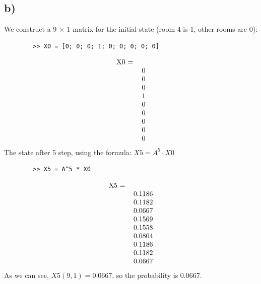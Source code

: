 \documentclass[12pt,en,a4paper]{article}
\begin{document}
	\subsection*{b)}
	We construct a 9 $\times$ 1 matrix for the initial state (room 4 is 1, other rooms are 0):
	\begin{mdframed}[hidealllines=true,backgroundcolor=magenta!10]
		\begin{lstlisting}
		>> X0 = [0; 0; 0; 1; 0; 0; 0; 0; 0]
		\end{lstlisting}
	\end{mdframed}
	\[
	\begin{tabular}{l r}
	X0 = & \\
	& 0 \\
	& 0 \\
	& 0 \\
	& 1 \\
	& 0 \\
	& 0 \\
	& 0 \\
	& 0 \\
	& 0 
	\end{tabular}
	\]
	The state after 5 step, using the formula: \(X5 = A^5 \cdot X0\)
	\begin{mdframed}[hidealllines=true,backgroundcolor=magenta!10]
		\begin{lstlisting}
		>> X5 = A^5 * X0
		\end{lstlisting}
	\end{mdframed}
	\[
	\begin{tabular}{l r}
	X5 = & \\
	& 0.1186 \\
	& 0.1182 \\
	& 0.0667 \\
	& 0.1569 \\
	& 0.1558 \\
	& 0.0804 \\
	& 0.1186 \\
	& 0.1182 \\
	& 0.0667
	\end{tabular}
	\]
	As we can see, \(X5(9,1)=0.0667\), so the probability is $0.0667$.
\end{document}
